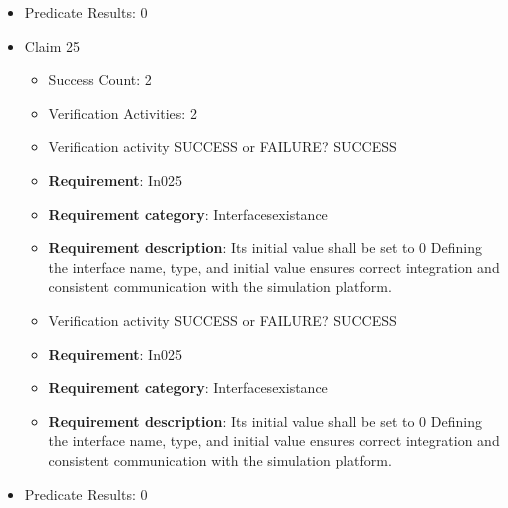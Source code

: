 \documentclass{article}
\begin{document}
\begin{itemize}
\begin{itemize}
					\item Verification activity SUCCESS or FAILURE? SUCCESS
		
						\item \textbf{Requirement}: In024 
						\item \textbf{Requirement category}: Interfacesexistance 
						\item \textbf{Requirement description}: Its initial value shall be scenarioDefault Defining the interface name, type, and initial value ensures correct integration and consistent communication with the simulation platform.
					
				\end{itemize}
				
									    
				\item Predicate Results: 0

  				  \item Claim 25
				\begin{itemize}
			    	\item Success Count: 2 
			    	\item Verification Activities: 2
					\item Verification activity SUCCESS or FAILURE? SUCCESS
		
						\item \textbf{Requirement}: In025 
						\item \textbf{Requirement category}: Interfacesexistance 
						\item \textbf{Requirement description}: Its initial value shall be set to 0 Defining the interface name, type, and initial value ensures correct integration and consistent communication with the simulation platform.
					
					\item Verification activity SUCCESS or FAILURE? SUCCESS
		
						\item \textbf{Requirement}: In025 
						\item \textbf{Requirement category}: Interfacesexistance 
						\item \textbf{Requirement description}: Its initial value shall be set to 0 Defining the interface name, type, and initial value ensures correct integration and consistent communication with the simulation platform.
					
				\end{itemize}
				
									    
				\item Predicate Results: 0


\end{itemize}
\end{document}
